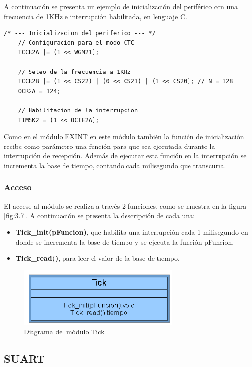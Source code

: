 A continuación se presenta un ejemplo de inicialización del periférico con una frecuencia de 1KHz e interrupción habilitada, en lenguaje C.

\begin{lstlisting}[style=CStyle]
	/* --- Inicializacion del periferico --- */
	// Configuracion para el modo CTC
	TCCR2A |= (1 << WGM21);
	
	// Seteo de la frecuencia a 1KHz
	TCCR2B |= (1 << CS22) | (0 << CS21) | (1 << CS20); // N = 128
	OCR2A = 124;
	
	// Habilitacion de la interrupcion
	TIMSK2 = (1 << OCIE2A);
\end{lstlisting}

Como en el módulo EXINT en este módulo también la función de inicialización recibe como parámetro una función para que sea ejecutada durante la interrupción de recepción. Además de ejecutar esta función en la interrupción se incrementa la base de tiempo, contando cada milisegundo que transcurra.

\subsubsection{Acceso}
El acceso al módulo se realiza a través 2 funciones, como se muestra en la figura \ref{fig:3.7}. A continuación se presenta la descripción de cada una:
\begin{itemize}
	\item \textbf{Tick\_init(pFuncion)}, que habilita una interrupción cada 1 milisegundo en donde se incrementa la base de tiempo y se ejecuta la función pFuncion.
	\item \textbf{Tick\_read()}, para leer el valor de la base de tiempo.
\end{itemize}

\begin{figure}[!ht]
	\centering
	\includegraphics[width=8cm,scale=1]{resources/3_7-moduloTick.png}
	\caption{Diagrama del módulo Tick}
	\label{fig:\thefigure}
\end{figure}

\subsection{SUART}
